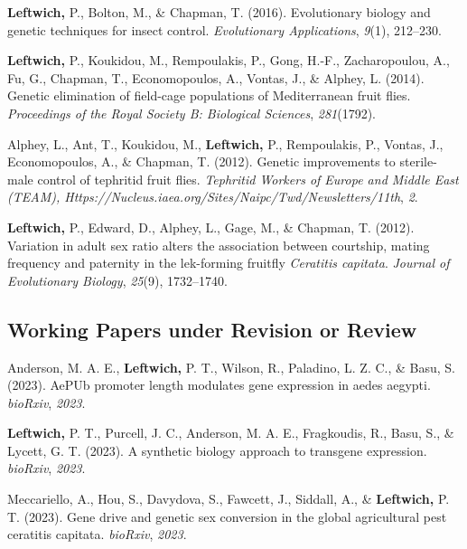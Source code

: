 \documentclass[11pt, a4paper]{awesome-cv}
\begin{document}
\leavevmode\hypertarget{ref-1}{}%
\textbf{Leftwich,} P., Bolton, M., \& Chapman, T. (2016). Evolutionary
biology and genetic techniques for insect control. \emph{Evolutionary
Applications}, \emph{9}(1), 212--230.

\leavevmode\hypertarget{ref-2}{}%
\textbf{Leftwich,} P., Koukidou, M., Rempoulakis, P., Gong, H.-F.,
Zacharopoulou, A., Fu, G., Chapman, T., Economopoulos, A., Vontas, J.,
\& Alphey, L. (2014). Genetic elimination of field-cage populations of
{Mediterranean} fruit flies. \emph{Proceedings of the Royal Society B:
Biological Sciences}, \emph{281}(1792).

\leavevmode\hypertarget{ref-18}{}%
Alphey, L., Ant, T., Koukidou, M., \textbf{Leftwich,} P., Rempoulakis,
P., Vontas, J., Economopoulos, A., \& Chapman, T. (2012). Genetic
improvements to sterile-male control of tephritid fruit flies.
\emph{Tephritid Workers of Europe and Middle East (TEAM),
Https://Nucleus.iaea.org/Sites/Naipc/Twd/Newsletters/11th}, \emph{2}.

\leavevmode\hypertarget{ref-4}{}%
\textbf{Leftwich,} P., Edward, D., Alphey, L., Gage, M., \& Chapman, T.
(2012). Variation in adult sex ratio alters the association between
courtship, mating frequency and paternity in the lek-forming fruitfly
\emph{{Ceratitis} capitata}. \emph{Journal of Evolutionary Biology},
\emph{25}(9), 1732--1740.

\endgroup

\hypertarget{working-papers-under-revision-or-review}{%
\subsection{Working Papers under Revision or
Review}\label{working-papers-under-revision-or-review}}

\begingroup
\setlength{\parindent}{0.2in}

\hypertarget{refs_working_paper}{}
\leavevmode\hypertarget{ref-4}{}%
Anderson, M. A. E., \textbf{Leftwich,} P. T., Wilson, R., Paladino, L.
Z. C., \& Basu, S. (2023). AePUb promoter length modulates gene
expression in aedes aegypti. \emph{bioRxiv}, \emph{2023}.

\leavevmode\hypertarget{ref-2}{}%
\textbf{Leftwich,} P. T., Purcell, J. C., Anderson, M. A. E.,
Fragkoudis, R., Basu, S., \& Lycett, G. T. (2023). A synthetic biology
approach to transgene expression. \emph{bioRxiv}, \emph{2023}.

\leavevmode\hypertarget{ref-3}{}%
Meccariello, A., Hou, S., Davydova, S., Fawcett, J., Siddall, A., \&
\textbf{Leftwich,} P. T. (2023). Gene drive and genetic sex conversion
in the global agricultural pest ceratitis capitata. \emph{bioRxiv},
\emph{2023}.
\end{document}
